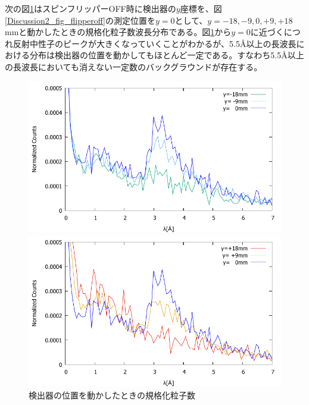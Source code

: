 次の図\ref{Discussion2_fig_detectormove}はスピンフリッパーOFF時に検出器の$y$座標を、図\ref{Discussion2_fig_flipperoff}の測定位置を$y=0$として、$y=-18,-9,0,+9,+18$mmと動かしたときの規格化粒子数波長分布である。図\ref{Discussion2_fig_detectormove}から$y=0$に近づくにつれ反射中性子のピークが大きくなっていくことがわかるが、5.5\AA 以上の長波長における分布は検出器の位置を動かしてもほとんど一定である。すなわち5.5\AA 以上の長波長においても消えない一定数のバックグラウンドが存在する。
\begin{figure}[h]
\begin{minipage}{0.5\hsize}
\centering
\includegraphics[width=\hsize]{discussion/BG/flippermove1.pdf}
\end{minipage}
\begin{minipage}{0.5\hsize}
\centering
\includegraphics[width=\hsize]{discussion/BG/flippermove2.pdf}
\end{minipage}
\caption{検出器の位置を動かしたときの規格化粒子数}\label{Discussion2_fig_detectormove}
\end{figure}

